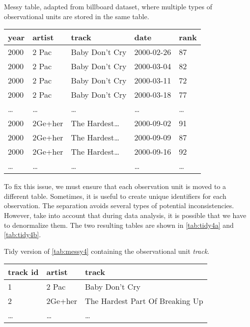 \begin{tablebox}[label=tab:messy4]{Messy table, adapted from billboard dataset, where multiple types of observational units are stored in the same table.}
  \centering
  \begin{tabular}{lllll}
    \toprule
    \textbf{year} & \textbf{artist} & \textbf{track} & \textbf{date} & \textbf{rank} \\
    \midrule
    2000 & 2 Pac & Baby Don't Cry & 2000-02-26 & 87 \\
    2000 & 2 Pac & Baby Don't Cry & 2000-03-04 & 82 \\
    2000 & 2 Pac & Baby Don't Cry & 2000-03-11 & 72 \\
    2000 & 2 Pac & Baby Don't Cry & 2000-03-18 & 77 \\
    \dots & \dots & \dots & \dots & \dots \\
    2000 & 2Ge+her & The Hardest\dots & 2000-09-02 & 91 \\
    2000 & 2Ge+her & The Hardest\dots & 2000-09-09 & 87 \\
    2000 & 2Ge+her & The Hardest\dots & 2000-09-16 & 92 \\
    \dots & \dots & \dots & \dots & \dots \\
    \bottomrule
  \end{tabular}
\end{tablebox}

To fix this issue, we must ensure that each observation unit is moved to a different table.
Sometimes, it is useful to create unique identifiers for each observation.
The separation avoids several types of potential inconsistencies.  However, take into
account that during data analysis, it is possible that we have to denormalize them.  The
two resulting tables are shown in \cref{tab:tidy4a} and \cref{tab:tidy4b}.

\begin{tablebox}[label=tab:tidy4a]{Tidy version of \cref{tab:messy4} containing the observational unit \emph{track}.}
  \centering
  \begin{tabular}{lll}
    \toprule
    \textbf{track id} & \textbf{artist} & \textbf{track} \\
    \midrule
    1 & 2 Pac & Baby Don't Cry \\
    2 & 2Ge+her & The Hardest Part Of Breaking Up \\
    \dots & \dots & \dots \\
    \bottomrule
  \end{tabular}
\end{tablebox}

